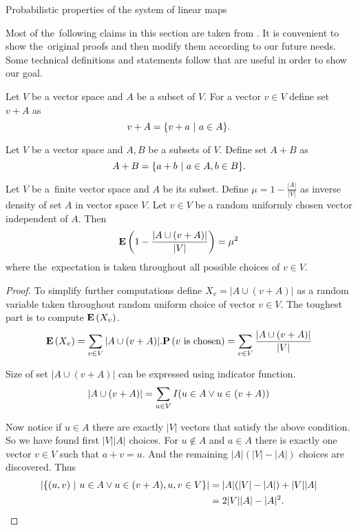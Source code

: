 \begin{section}{Probabilistic properties of the system of linear maps}

Most of the~following claims in this section are taken from \cite{DBLP:journals/jacm/AlonDMPT99}. It is convenient to show the~original proofs and then modify them according to our future needs. Some technical definitions and statements follow that are useful in order to show our goal.

\begin{definition}
Let $V$ be a vector space and $A$ be a subset of $V$. For a vector $v \in V$ define set $v + A$ as
\[ v + A = \{ v + a \ | \  a \in A \} \text{.} \] 
\end{definition}

\begin{definition}
Let $V$ be a vector space and $A, B$ be a subsets of $V$. Define set $A + B$ as
\[ A + B = \{ a + b \ | \  a \in A, b \in B \} \text{.} \] 
\end{definition}

\begin{lemma}
\label{lemma-choose-random-vector}
Let $V$ be a~finite vector space and $A$ be its subset. Define $\mu = 1 - \frac{|A|}{|V|}$ as inverse density of set $A$ in vector space $V$. Let $v \in V$ be a random uniformly chosen vector independent of $A$. Then
\begin{displaymath}
\mathbf{E}\left(1 - \frac{|A \cup (v + A)|}{|V|}\right) = \mu^2
\end{displaymath}
where the~expectation is taken throughout all possible choices of $v \in V$.

\begin{proof}
To simplify further computations define $X_v = |A \cup (v + A)|$ as a random variable taken throughout random uniform choice of vector $v \in V$. The toughest part is to compute $\mathbf{E}\left(X_v\right)$.
\[
\mathbf{E}\left(X_v\right) = \displaystyle\sum_{v \in V} |A \cup (v + A)| . \mathbf{P}\left(v \text{ is chosen}\right) = \displaystyle\sum_{v \in V} \frac{|A \cup (v + A)|}{|V|}
\]

Size of set $|A \cup (v + A)|$ can be expressed using indicator function.
\[
|A \cup (v + A)| = \displaystyle\sum_{u \in V} I(u \in A \vee u \in (v + A)) \\
\]

Now notice if $u \in A$ there are exactly $|V|$ vectors that satisfy the above condition. So we have found first $|V||A|$ choices. For $u \notin A$ and $a \in A$ there is exactly one vector $v \in V$ such that $a + v = u$. And the remaining $|A|(|V| - |A|)$ choices are discovered. Thus 
\[ 
\begin{split}
|\{(u, v) \ | \  u \in A \vee u \in (v + A), u, v \in V \}| 
	& = |A|(|V| - |A|) + |V||A| \\
	& = 2|V||A| - |A|^2 \text{.} \\
\end{split}
\]


\end{proof}
\end{lemma}
\end{section}
